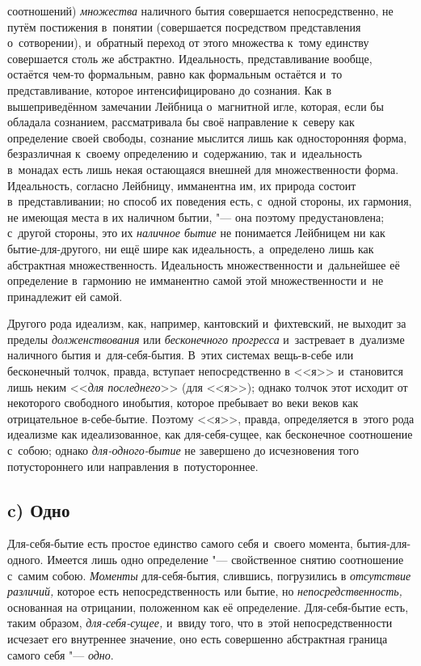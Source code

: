 соотношений) {\em множества} наличного бытия
совершается непосредственно, не путём постижения в~понятии (совершается
посредством представления о~сотворении), и~обратный переход от этого
множества к~тому единству совершается столь же абстрактно. Идеальность,
представливание вообще, остаётся чем-то формальным, равно как формальным
остаётся и~то представливание, которое интенсифицировано до сознания. Как в
вышеприведённом замечании Лейбница о~магнитной игле, которая, если
бы обладала сознанием, рассматривала бы своё направление к~северу как
определение своей свободы, сознание мыслится лишь как односторонняя форма,
безразличная к~своему определению и~содержанию, так и~идеальность в~монадах
есть лишь некая остающаяся внешней для множественности форма. Идеальность,
согласно Лейбницу, имманентна им, их природа состоит в~представливании; но
способ их поведения есть, с~одной стороны, их гармония, не имеющая места в
их наличном бытии, "--- она поэтому предустановлена; с~другой стороны, это их
{\em наличное бытие} не понимается Лейбницем ни как
бытие-для-другого, ни ещё шире как идеальность, а~определено лишь как
абстрактная множественность. Идеальность множественности и~дальнейшее её
определение в~гармонию не имманентно самой этой множественности и~не
принадлежит ей самой.

Другого рода идеализм, как, например, кантовский и~фихтевский, не выходит за
пределы {\em долженствования} или
{\em бесконечного прогресса} и~застревает в~дуализме
наличного бытия и~для-себя-бытия. В~этих системах вещь-в-себе или
бесконечный толчок, правда, вступает непосредственно в <<я>> и~становится
лишь неким <<{\em для последнего}>> (для <<я>>); однако
толчок этот исходит от некоторого свободного инобытия, которое пребывает во
веки веков как отрицательное в-себе-бытие. Поэтому <<я>>, правда,
определяется в~этого рода идеализме как идеализованное, как для-себя-сущее,
как бесконечное соотношение с~собою; однако
{\em для-одного-бытие} не завершено до исчезновения
того потустороннего или направления в~потустороннее.

\subsection[c) Одно]{c) Одно}

Для-себя-бытие есть простое единство самого себя и~своего момента,
бытия-для-одного. Имеется лишь одно определение "--- свойственное снятию
соотношение с~самим собою. {\em Моменты}
для-себя-бытия, слившись, погрузились в {\em отсутствие
различий,} которое есть непосредственность или бытие, но
{\em непосредственность,} основанная на отрицании,
положенном как её определение. Для-себя-бытие есть, таким образом,
{\em для-себя-сущее,} и~ввиду того, что в~этой
непосредственности исчезает его внутреннее значение, оно есть совершенно
абстрактная граница самого себя "--- {\em одно}.

